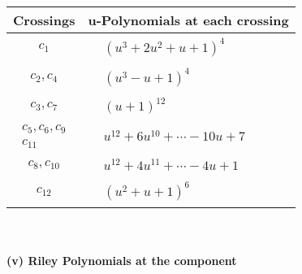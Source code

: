 \documentclass[1p]{elsarticle_modified}
\theoremstyle{definition}
\begin{document}
\begin{tabular}{m{50pt}|m{274pt}}
Crossings & \hspace{64pt}u-Polynomials at each crossing \\
\hline $$\begin{aligned}c_{1}\end{aligned}$$&$\begin{aligned}
&(u^3+2 u^2+u+1)^4
\end{aligned}$\\
\hline $$\begin{aligned}c_{2},c_{4}\end{aligned}$$&$\begin{aligned}
&(u^3- u+1)^4
\end{aligned}$\\
\hline $$\begin{aligned}c_{3},c_{7}\end{aligned}$$&$\begin{aligned}
&(u+1)^{12}
\end{aligned}$\\
\hline $$\begin{aligned}c_{5},c_{6},c_{9}\\c_{11}\end{aligned}$$&$\begin{aligned}
&u^{12}+6 u^{10}+\cdots-10 u+7
\end{aligned}$\\
\hline $$\begin{aligned}c_{8},c_{10}\end{aligned}$$&$\begin{aligned}
&u^{12}+4 u^{11}+\cdots-4 u+1
\end{aligned}$\\
\hline $$\begin{aligned}c_{12}\end{aligned}$$&$\begin{aligned}
&(u^2+u+1)^6
\end{aligned}$\\
\hline
\end{tabular}\\~\\
\newpage\renewcommand{\arraystretch}{1}
\flushleft \textbf{(v) Riley Polynomials at the component}\newline \\
\end{document}
